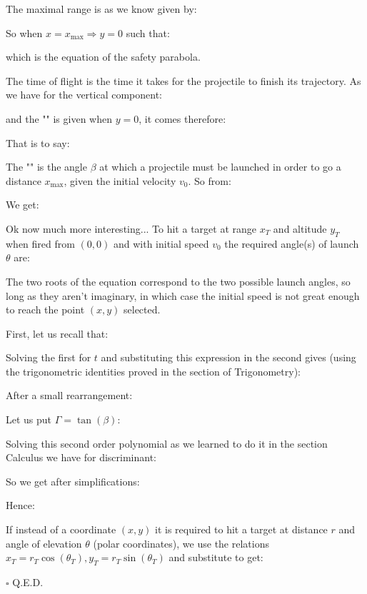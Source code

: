	The maximal range is as we know given by:
	
	So when $x=x_{\max}\Rightarrow y=0$ such that:
	
	which is the equation of the safety parabola.
	
	The time of flight is the time it takes for the projectile to finish its trajectory. As we have for the vertical component:
	
	and the "" is given when $y=0$, it comes therefore:
	
	That is to say:
	
	The "" is the angle $\beta$ at which a projectile must be launched in order to go a distance $x_{\max}$, given the initial velocity $v_0$. So from:
	
	We get:
	
	Ok now much more interesting... To hit a target at range $x_T$ and altitude $y_T$ when fired from $(0,0)$ and with initial speed $v_0$ the required angle(s) of launch $\theta$ are:
	
	The two roots of the equation correspond to the two possible launch angles, so long as they aren't imaginary, in which case the initial speed is not great enough to reach the point $(x,y)$ selected.
	\begin{dem}
	First, let us recall that:
	
	Solving the first for $t$ and substituting this expression in the second gives (using the trigonometric identities proved in the section of Trigonometry):
	
	After a small rearrangement:
	
	Let us put $\Gamma=\tan(\beta)$:
	
	Solving this second order polynomial as we learned to do it in the section Calculus we have for discriminant:
	
	So we get after simplifications:
	
	Hence:
	
	If instead of a coordinate $(x,y)$ it is required to hit a target at distance $r$ and angle of elevation $\theta$  (polar coordinates), we use the relations $x_T=r_T\cos(\theta_T), y_T=r_T\sin(\theta_T)$  and substitute to get:
	

	\begin{flushright}
		$\square$  Q.E.D.
	\end{flushright}
	\end{dem}
	
	\pagebreak
